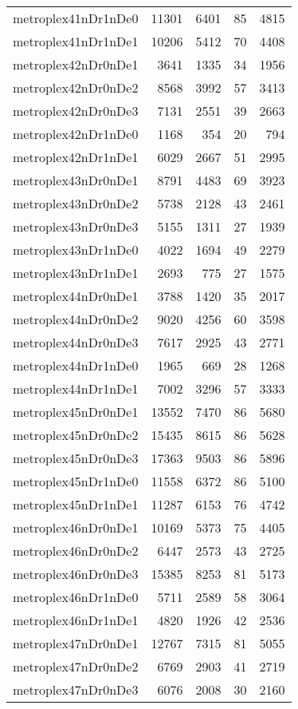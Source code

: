 \documentclass[../../../thesis.tex]{subfiles}
\begin{document}
\begin{longtable}{lrrrr}
metroplex41nDr1nDe0 & 11301 & 6401 & 85 & 4815 \\
metroplex41nDr1nDe1 & 10206 & 5412 & 70 & 4408 \\
metroplex42nDr0nDe1 & 3641 & 1335 & 34 & 1956 \\
metroplex42nDr0nDe2 & 8568 & 3992 & 57 & 3413 \\
metroplex42nDr0nDe3 & 7131 & 2551 & 39 & 2663 \\
metroplex42nDr1nDe0 & 1168 & 354 & 20 & 794 \\
metroplex42nDr1nDe1 & 6029 & 2667 & 51 & 2995 \\
metroplex43nDr0nDe1 & 8791 & 4483 & 69 & 3923 \\
metroplex43nDr0nDe2 & 5738 & 2128 & 43 & 2461 \\
metroplex43nDr0nDe3 & 5155 & 1311 & 27 & 1939 \\
metroplex43nDr1nDe0 & 4022 & 1694 & 49 & 2279 \\
metroplex43nDr1nDe1 & 2693 & 775 & 27 & 1575 \\
metroplex44nDr0nDe1 & 3788 & 1420 & 35 & 2017 \\
metroplex44nDr0nDe2 & 9020 & 4256 & 60 & 3598 \\
metroplex44nDr0nDe3 & 7617 & 2925 & 43 & 2771 \\
metroplex44nDr1nDe0 & 1965 & 669 & 28 & 1268 \\
metroplex44nDr1nDe1 & 7002 & 3296 & 57 & 3333 \\
metroplex45nDr0nDe1 & 13552 & 7470 & 86 & 5680 \\
metroplex45nDr0nDe2 & 15435 & 8615 & 86 & 5628 \\
metroplex45nDr0nDe3 & 17363 & 9503 & 86 & 5896 \\
metroplex45nDr1nDe0 & 11558 & 6372 & 86 & 5100 \\
metroplex45nDr1nDe1 & 11287 & 6153 & 76 & 4742 \\
metroplex46nDr0nDe1 & 10169 & 5373 & 75 & 4405 \\
metroplex46nDr0nDe2 & 6447 & 2573 & 43 & 2725 \\
metroplex46nDr0nDe3 & 15385 & 8253 & 81 & 5173 \\
metroplex46nDr1nDe0 & 5711 & 2589 & 58 & 3064 \\
metroplex46nDr1nDe1 & 4820 & 1926 & 42 & 2536 \\
metroplex47nDr0nDe1 & 12767 & 7315 & 81 & 5055 \\
metroplex47nDr0nDe2 & 6769 & 2903 & 41 & 2719 \\
metroplex47nDr0nDe3 & 6076 & 2008 & 30 & 2160 \\

\end{longtable}
\end{document}
